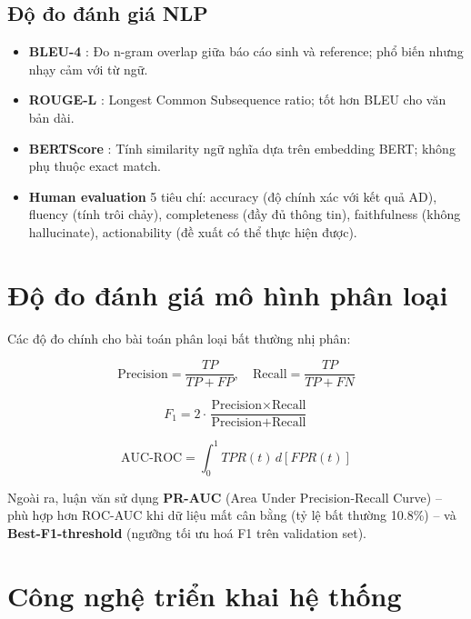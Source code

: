 \subsection{Độ đo đánh giá NLP}

\begin{itemize}
  \item \textbf{BLEU-4} \cite{papineni2002bleu}: Đo n-gram overlap giữa báo cáo sinh và reference; phổ biến nhưng nhạy cảm với từ ngữ.
  \item \textbf{ROUGE-L} \cite{lin2004rouge}: Longest Common Subsequence ratio; tốt hơn BLEU cho văn bản dài.
  \item \textbf{BERTScore} \cite{zhang2020bertscore}: Tính similarity ngữ nghĩa dựa trên embedding BERT; không phụ thuộc exact match.
  \item \textbf{Human evaluation} 5 tiêu chí: accuracy (độ chính xác với kết quả AD), fluency (tính trôi chảy), completeness (đầy đủ thông tin), faithfulness (không hallucinate), actionability (đề xuất có thể thực hiện được).
\end{itemize}

\section{Độ đo đánh giá mô hình phân loại}

Các độ đo chính cho bài toán phân loại bất thường nhị phân:

\begin{equation}
  \text{Precision} = \frac{TP}{TP + FP}, \quad
  \text{Recall} = \frac{TP}{TP + FN}
  \label{eq:prec_rec}
\end{equation}

\begin{equation}
  F_1 = 2 \cdot \frac{\text{Precision} \times \text{Recall}}{\text{Precision} + \text{Recall}}
  \label{eq:f1}
\end{equation}

\begin{equation}
  \text{AUC-ROC} = \int_0^1 TPR(t)\, d[FPR(t)]
  \label{eq:auc}
\end{equation}

Ngoài ra, luận văn sử dụng \textbf{PR-AUC} (Area Under Precision-Recall Curve) -- phù hợp hơn ROC-AUC khi dữ liệu mất cân bằng (tỷ lệ bất thường 10.8\%) -- và \textbf{Best-F1-threshold} (ngưỡng tối ưu hoá F1 trên validation set).

\section{Công nghệ triển khai hệ thống}

